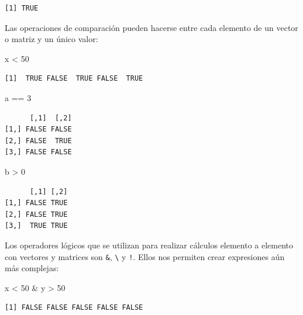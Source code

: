 \documentclass[
]{book}
\newenvironment{Shaded}{\begin{snugshade}}{\end{snugshade}}
\newcommand{\DecValTok}[1]{\textcolor[rgb]{0.00,0.00,0.81}{#1}}
\newcommand{\NormalTok}[1]{#1}
\newcommand{\SpecialCharTok}[1]{\textcolor[rgb]{0.00,0.00,0.00}{#1}}
\begin{document}
\begin{verbatim}
[1] TRUE
\end{verbatim}

Las operaciones de comparación pueden hacerse entre cada elemento de un vector o matriz y un único valor:

\begin{Shaded}
\begin{Highlighting}[]
\NormalTok{x }\SpecialCharTok{\textless{}} \DecValTok{50}
\end{Highlighting}
\end{Shaded}

\begin{verbatim}
[1]  TRUE FALSE  TRUE FALSE  TRUE
\end{verbatim}

\begin{Shaded}
\begin{Highlighting}[]
\NormalTok{a }\SpecialCharTok{==} \DecValTok{3}
\end{Highlighting}
\end{Shaded}

\begin{verbatim}
      [,1]  [,2]
[1,] FALSE FALSE
[2,] FALSE  TRUE
[3,] FALSE FALSE
\end{verbatim}

\begin{Shaded}
\begin{Highlighting}[]
\NormalTok{b }\SpecialCharTok{\textgreater{}} \DecValTok{0}
\end{Highlighting}
\end{Shaded}

\begin{verbatim}
      [,1] [,2]
[1,] FALSE TRUE
[2,] FALSE TRUE
[3,]  TRUE TRUE
\end{verbatim}

Los operadores lógicos que se utilizan para realizar cálculos elemento a elemento con vectores y matrices son \texttt{\&}, \texttt{\textbackslash{}} y \texttt{!}. Ellos nos permiten crear expresiones aún más complejas:

\begin{Shaded}
\begin{Highlighting}[]
\NormalTok{x }\SpecialCharTok{\textless{}} \DecValTok{50} \SpecialCharTok{\&}\NormalTok{ y }\SpecialCharTok{\textgreater{}} \DecValTok{50}
\end{Highlighting}
\end{Shaded}

\begin{verbatim}
[1] FALSE FALSE FALSE FALSE FALSE
\end{verbatim}
\end{document}
